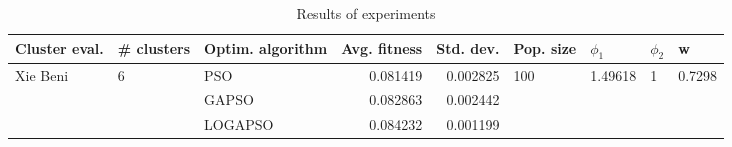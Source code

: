 \begin{table}
\centering
\caption{Results of experiments}
\begin{tabular}{lllrrllll}
\toprule
            Cluster eval. &        \# clusters & Optim. algorithm &  Avg. fitness &  Std. dev. &            Pop. size &               $\phi_{1}$ &         $\phi_{2}$ &                       w \\
\midrule
\multirow{3}{*}{Xie Beni} & \multirow{3}{*}{6} &              PSO &      0.081419 &   0.002825 & \multirow{3}{*}{100} & \multirow{3}{*}{1.49618} & \multirow{3}{*}{1} & \multirow{3}{*}{0.7298} \\
                          &                    &            GAPSO &      0.082863 &   0.002442 &                      &                          &                    &                         \\
                          &                    &          LOGAPSO &      0.084232 &   0.001199 &                      &                          &                    &                         \\
\bottomrule
\end{tabular}
\end{table}
